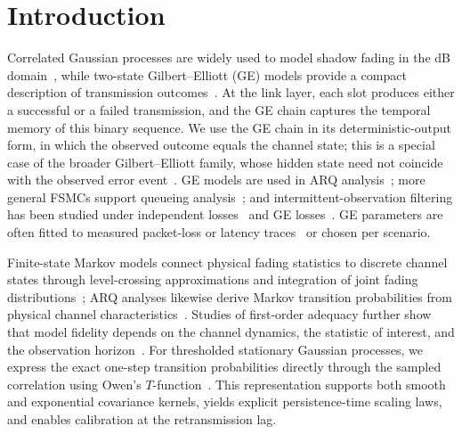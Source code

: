 \documentclass[conference]{IEEEtran}
\begin{document}
\section{Introduction}
Correlated Gaussian processes are widely used to model shadow fading in the dB domain~\cite{gudmundson1991}, while two-state Gilbert--Elliott (GE) models provide a compact description of transmission outcomes~\cite{gilbert1960,elliott1963}. At the link layer, each slot produces either a successful or a failed transmission, and the GE chain captures the temporal memory of this binary sequence. We use the GE chain in its deterministic-output form, in which the observed outcome equals the channel state; this is a special case of the broader Gilbert--Elliott family, whose hidden state need not coincide with the observed error event~\cite{gilbert1960,elliott1963}. GE models are used in ARQ analysis~\cite{zorzi1997,kim1999}; more general FSMCs support queueing analysis~\cite{liu2005}; and intermittent-observation filtering has been studied under independent losses~\cite{sinopoli2004} and GE losses~\cite{wu2018}. GE parameters are often fitted to measured packet-loss or latency traces~\cite{hasslinger2008,nielsen2019} or chosen per scenario.

Finite-state Markov models connect physical fading statistics to discrete channel states through level-crossing approximations and integration of joint fading distributions~\cite{wang1995,zhang1999,sadeghi2008}; ARQ analyses likewise derive Markov transition probabilities from physical channel characteristics~\cite{zorzi1997}. Studies of first-order adequacy further show that model fidelity depends on the channel dynamics, the statistic of interest, and the observation horizon~\cite{wang1996,tan2000,zorzi1995}. For thresholded stationary Gaussian processes, we express the exact one-step transition probabilities directly through the sampled correlation using Owen's $T$-function~\cite{owen1956}. This representation supports both smooth and exponential covariance kernels, yields explicit persistence-time scaling laws, and enables calibration at the retransmission lag.
\end{document}

